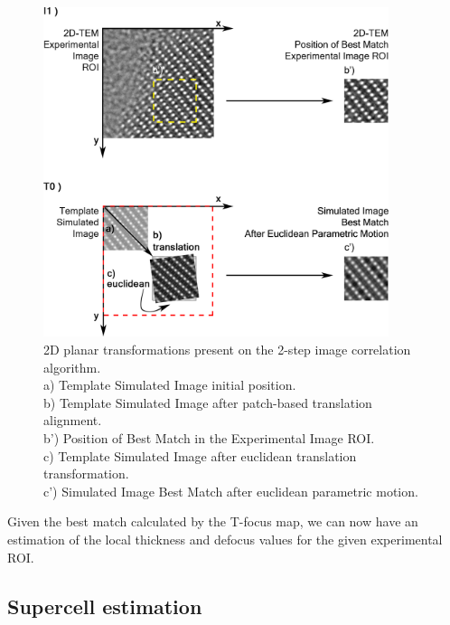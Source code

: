 \documentclass[
  oneside,
  11pt, a4paper,
  footinclude=true,
  headinclude=true,
  cleardoublepage=empty
]{scrbook}
\begin{document}
	\begin{figure}[!ht]
	\begin{center}
		\includegraphics[width=0.9\textwidth]{img/2D_planar_transformations.png}
			\caption[2D planar transformations present on the 2-step image correlation algorithm]{2D planar transformations present on the 2-step image correlation algorithm.\\ 
			a) Template Simulated Image initial position.\\
			b) Template Simulated Image after patch-based translation alignment.\\
			b') Position of Best Match in the Experimental Image ROI.\\
			c) Template Simulated Image after euclidean translation transformation.\\
			c') Simulated Image Best Match after euclidean parametric motion.\\
			}
	\label{fig:2d_planar_transformations}
	\end{center}
	\end{figure}
	
	Given the best match calculated by the T-focus map, we can now have an estimation of the local thickness and defocus values for the given experimental ROI.\par 



	
\subsection{Supercell estimation}
\end{document}
